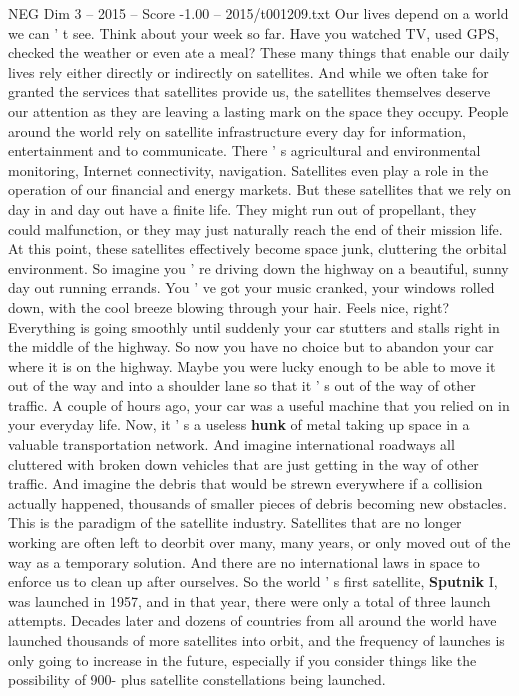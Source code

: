 \begin{textsample}{NEG Dim 3 – 2015 – Score -1.00 – 2015/t001209.txt}  \label{ex:f3_neg_049}
Our lives depend on a world we can ' t see.
Think about your week so far.
Have you watched TV, used GPS, checked the weather or even ate a meal?
These many things that enable our daily lives rely either directly or indirectly on satellites.
And while we often take for granted the services that satellites provide us, the satellites themselves deserve our attention as they are leaving a lasting mark on the space they occupy.
People around the world rely on satellite infrastructure every day for information, entertainment and to communicate.
There ' s agricultural and environmental monitoring, Internet connectivity, navigation.
Satellites even play a role in the operation of our financial and energy markets.
But these satellites that we rely on day in and day out have a finite life.
They might run out of propellant, they could malfunction, or they may just naturally reach the end of their mission life.
At this point, these satellites effectively become space junk, cluttering the orbital environment.
So imagine you ' re driving down the highway on a beautiful, sunny day out running errands.
You ' ve got your music cranked, your windows rolled down, with the cool breeze blowing through your hair.
Feels nice, right?
Everything is going smoothly until suddenly your car stutters and stalls right in the middle of the highway.
So now you have no choice but to abandon your car where it is on the highway.
Maybe you were lucky enough to be able to move it out of the way and into a shoulder lane so that it ' s out of the way of other traffic.
A couple of hours ago, your car was a useful machine that you relied on in your everyday life.
Now, it ' s a useless \textbf{hunk} of metal taking up space in a valuable transportation network.
And imagine international roadways all cluttered with broken down vehicles that are just getting in the way of other traffic.
And imagine the debris that would be strewn everywhere if a collision actually happened, thousands of smaller pieces of debris becoming new obstacles.
This is the paradigm of the satellite industry.
Satellites that are no longer working are often left to deorbit over many, many years, or only moved out of the way as a temporary solution.
And there are no international laws in space to enforce us to clean up after ourselves.
So the world ' s first satellite, \textbf{Sputnik} I, was launched in 1957, and in that year, there were only a total of three launch attempts.
Decades later and dozens of countries from all around the world have launched thousands of more satellites into orbit, and the frequency of launches is only going to increase in the future, especially if you consider things like the possibility of 900- plus satellite constellations being launched.

\end{textsample}
